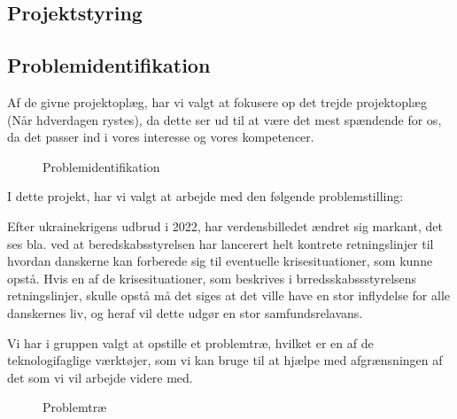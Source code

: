 \subsection{Projektstyring}


\subsection{Problemidentifikation}
Af de givne projektoplæg, har vi valgt at fokusere op det trejde projektoplæg (Når hdverdagen rystes), da dette ser ud til at være det mest spændende for os, da det passer ind i vores interesse og vores kompetencer.




\begin{figure}[H]
    \centering
    \caption{Problemidentifikation}
\end{figure}


I dette projekt, har vi valgt at arbejde med den følgende problemstilling:

Efter ukrainekrigens udbrud i 2022, har verdensbilledet ændret sig markant, det ses bla. ved at beredskabsstyrelsen har lancerert helt kontrete retningslinjer til hvordan danskerne kan forberede sig til eventuelle krisesituationer, som kunne opstå. Hvis en af de krisesituationer, som beskrives i brredsskabssstyrelsens retningslinjer, skulle opstå må det siges at det ville have en stor inflydelse for alle danskernes liv, og heraf vil dette udgør en stor samfundsrelavans.

Vi har i gruppen valgt at opstille et problemtræ, hvilket er en af de teknologifaglige værktøjer, 
som vi kan bruge til at hjælpe med afgrænsningen af det som vi vil arbejde videre med.


\begin{figure}[H]
    \centering
    \label{fig:problemtræ}
    \caption{Problemtræ}
\end{figure}



